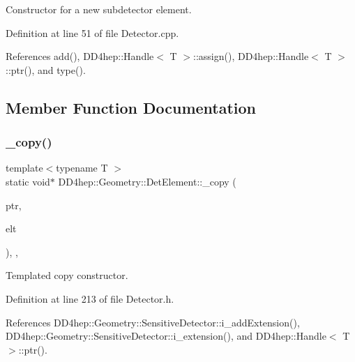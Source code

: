 Constructor for a new subdetector element. 



Definition at line 51 of file Detector.\+cpp.



References add(), D\+D4hep\+::\+Handle$<$ T $>$\+::assign(), D\+D4hep\+::\+Handle$<$ T $>$\+::ptr(), and type().



\subsection{Member Function Documentation}
\hypertarget{class_d_d4hep_1_1_geometry_1_1_det_element_a2098e1c10dc049af5040b380d2af1983}{}\label{class_d_d4hep_1_1_geometry_1_1_det_element_a2098e1c10dc049af5040b380d2af1983} 
\subsubsection{\texorpdfstring{\+\_\+copy()}{\_copy()}}
{\footnotesize\ttfamily template$<$typename T $>$ \\
static void$\ast$ D\+D4hep\+::\+Geometry\+::\+Det\+Element\+::\+\_\+copy (\begin{DoxyParamCaption}\item[{const void $\ast$}]{ptr,  }\item[{\hyperlink{class_d_d4hep_1_1_geometry_1_1_det_element}{Det\+Element}}]{elt }\end{DoxyParamCaption})\hspace{0.3cm}{\ttfamily [inline]}, {\ttfamily [static]}, {\ttfamily [protected]}}



Templated copy constructor. 



Definition at line 213 of file Detector.\+h.



References D\+D4hep\+::\+Geometry\+::\+Sensitive\+Detector\+::i\+\_\+add\+Extension(), D\+D4hep\+::\+Geometry\+::\+Sensitive\+Detector\+::i\+\_\+extension(), and D\+D4hep\+::\+Handle$<$ T $>$\+::ptr().

\hypertarget{class_d_d4hep_1_1_geometry_1_1_det_element_a4b7fa2ffe881a6699e88f5f24541b350}{}\label{class_d_d4hep_1_1_geometry_1_1_det_element_a4b7fa2ffe881a6699e88f5f24541b350} 

